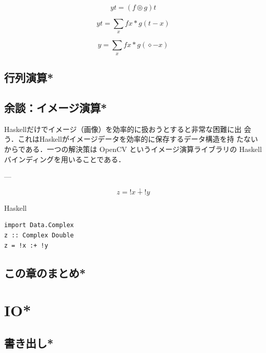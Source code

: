 \documentclass[a5paper,twoside,fleqn]{jsbook}
\newcommand{\programminglanguage}[1]{\textsf{#1}}
\newcommand{\haskell}{\programminglanguage{Haskell}}
\newenvironment{haskellcode}{\begin{itembox}[r]{\haskell}}{\end{itembox}}
\newcommand{\mAnonParam}{\diamond}
\DeclareMathOperator{\mComplexPlus}{\dotplus}
\begin{document}
$$
yt=(f\circledcirc g)t
$$


$$
yt=\sum_xfx*g(t-x)
$$

$$
y=\sum_xfx*g(\mAnonParam-x)
$$

\section{行列演算*}


\section{余談：イメージ演算*}

\haskell だけでイメージ（画像）を効率的に扱おうとすると非常な困難に出
会う．これは\haskell がイメージデータを効率的に保存するデータ構造を持
たないからである．一つの解決策は OpenCV というイメージ演算ライブラリの
\haskell バインディングを用いることである．


---


\begin{equation}
z={}!x{}\mComplexPlus{}!y
\end{equation}

\begin{haskellcode}
\begin{verbatim}
import Data.Complex
z :: Complex Double
z = !x :+ !y
\end{verbatim}
\end{haskellcode}


\section{この章のまとめ*}

\chapter{IO*}
\section{書き出し*}
\end{document}
